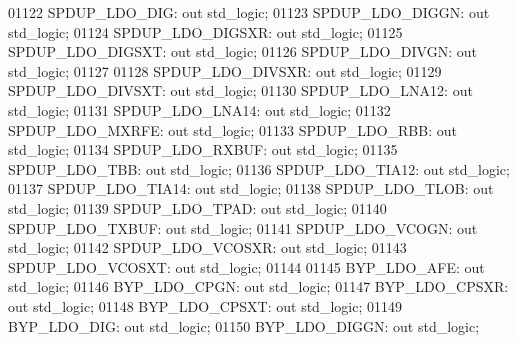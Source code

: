 \begin{DoxyCode}
01122         SPDUP\_LDO\_DIG:  \textcolor{keywordflow}{out} \textcolor{comment}{std\_logic};
01123         SPDUP\_LDO\_DIGGN:    \textcolor{keywordflow}{out} \textcolor{comment}{std\_logic};
01124         SPDUP\_LDO\_DIGSXR:   \textcolor{keywordflow}{out} \textcolor{comment}{std\_logic};
01125         SPDUP\_LDO\_DIGSXT:   \textcolor{keywordflow}{out} \textcolor{comment}{std\_logic};
01126         SPDUP\_LDO\_DIVGN:    \textcolor{keywordflow}{out} \textcolor{comment}{std\_logic};
01127 
01128         SPDUP\_LDO\_DIVSXR:   \textcolor{keywordflow}{out} \textcolor{comment}{std\_logic};
01129         SPDUP\_LDO\_DIVSXT:   \textcolor{keywordflow}{out} \textcolor{comment}{std\_logic};
01130         SPDUP\_LDO\_LNA12:    \textcolor{keywordflow}{out} \textcolor{comment}{std\_logic};
01131         SPDUP\_LDO\_LNA14:    \textcolor{keywordflow}{out} \textcolor{comment}{std\_logic};
01132         SPDUP\_LDO\_MXRFE:    \textcolor{keywordflow}{out} \textcolor{comment}{std\_logic};
01133         SPDUP\_LDO\_RBB:  \textcolor{keywordflow}{out} \textcolor{comment}{std\_logic};
01134         SPDUP\_LDO\_RXBUF:    \textcolor{keywordflow}{out} \textcolor{comment}{std\_logic};
01135         SPDUP\_LDO\_TBB:  \textcolor{keywordflow}{out} \textcolor{comment}{std\_logic};
01136         SPDUP\_LDO\_TIA12:    \textcolor{keywordflow}{out} \textcolor{comment}{std\_logic};
01137         SPDUP\_LDO\_TIA14:    \textcolor{keywordflow}{out} \textcolor{comment}{std\_logic};
01138         SPDUP\_LDO\_TLOB: \textcolor{keywordflow}{out} \textcolor{comment}{std\_logic};
01139         SPDUP\_LDO\_TPAD: \textcolor{keywordflow}{out} \textcolor{comment}{std\_logic};
01140         SPDUP\_LDO\_TXBUF:    \textcolor{keywordflow}{out} \textcolor{comment}{std\_logic};
01141         SPDUP\_LDO\_VCOGN:    \textcolor{keywordflow}{out} \textcolor{comment}{std\_logic};
01142         SPDUP\_LDO\_VCOSXR:   \textcolor{keywordflow}{out} \textcolor{comment}{std\_logic};
01143         SPDUP\_LDO\_VCOSXT:   \textcolor{keywordflow}{out} \textcolor{comment}{std\_logic};
01144 
01145         BYP\_LDO\_AFE:    \textcolor{keywordflow}{out} \textcolor{comment}{std\_logic};
01146         BYP\_LDO\_CPGN:   \textcolor{keywordflow}{out} \textcolor{comment}{std\_logic};
01147         BYP\_LDO\_CPSXR:  \textcolor{keywordflow}{out} \textcolor{comment}{std\_logic};
01148         BYP\_LDO\_CPSXT:  \textcolor{keywordflow}{out} \textcolor{comment}{std\_logic};
01149         BYP\_LDO\_DIG:    \textcolor{keywordflow}{out} \textcolor{comment}{std\_logic};
01150         BYP\_LDO\_DIGGN:  \textcolor{keywordflow}{out} \textcolor{comment}{std\_logic};

\end{DoxyCode}
